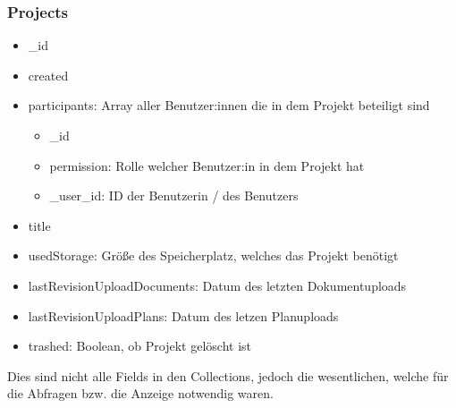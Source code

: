 \subsubsection{Projects}
\begin{itemize}
    \item \_id
    \item created
    \item participants: Array aller Benutzer:innen die in dem Projekt beteiligt sind
        \begin{itemize}
            \item \_id
            \item permission: Rolle welcher Benutzer:in in dem Projekt hat
            \item \_user\_id: ID der Benutzerin / des Benutzers
        \end{itemize}
    \item title
    \item usedStorage: Größe des Speicherplatz, welches das Projekt benötigt
    \item lastRevisionUploadDocuments: Datum des letzten Dokumentuploads
    \item lastRevisionUploadPlans: Datum des letzen Planuploads
    \item trashed: Boolean, ob Projekt gelöscht ist
\end{itemize}
Dies sind nicht alle Fields in den Collections, jedoch die wesentlichen, welche für die Abfragen bzw. die Anzeige notwendig waren.